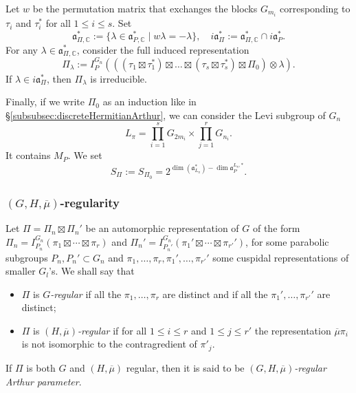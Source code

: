 \documentclass[letterpaper,11pt]{amsart}
\newcommand{\fa}{\mathfrak{a}}
\newcommand{\C}{\mathbb{C}}
\newcommand{\<}{\negthickspace}
\theoremstyle{definition}
\theoremstyle{plain}
\theoremstyle{remark}
\numberwithin{equation}{section}
\begin{document}
Let $w$ be the permutation matrix that exchanges the blocks $G_{m_i}$ corresponding to $\tau_i$ and $\tau_i^*$ for all $1 \leq i \leq s$. Set
\begin{equation}
\label{eq:fa_Pi}
    \fa_{\Pi,\C}^*:=\{ \lambda \in \fa_{P,\C}^* \; | \; w \lambda=-\lambda\}, \quad i\fa_{\Pi}^*:=\fa_{\Pi,\C}^* \cap i \fa_P^*.
\end{equation}
For any $\lambda \in \fa_{\Pi,\C}^*$, consider the full induced representation
\begin{equation*}
    \Pi_\lambda:=I_P^{G_n}(((\tau_1 \boxtimes \tau_1^*) \boxtimes \hdots \boxtimes (\tau_s \boxtimes \tau_s^*) \boxtimes \Pi_0)\otimes\lambda).
\end{equation*}
If $\lambda \in i\fa_{\Pi}^*$, then $\Pi_\lambda$ is irreducible.

Finally, if we write $\Pi_0$ as an induction like in \S\ref{subsubsec:discreteHermitianArthur}, we can consider the Levi subgroup of $G_n$
\begin{equation*}
    L_\pi=\prod_{i=1}^s G_{2 m_i} \times \prod_{j=1}^r G_{n_i}.
\end{equation*}
It contains $M_P$. We set
\begin{equation}
\label{eq:discrete_SPI_defi}
    S_{\Pi}:=S_{\Pi_0}=2^{\dim(\fa^*_{L_\pi})-\dim \fa_{P}^{L_\pi,*}}.
\end{equation}


\subsubsection{$(G,H,\overline{\mu})$-regularity}

Let $\Pi=\Pi_n \boxtimes \Pi_n'$ be an automorphic representation of $G$ of the form $\Pi_n=I_{P_n}^{G_n} (\pi_1 \boxtimes \cdots \boxtimes \pi_r)$ and $\Pi_n'=I_{P_n'}^{G_n} (\pi_1'\boxtimes \cdots \boxtimes \pi_{r'}')$, for some parabolic subgroups $P_n,P_n' \subset G_n$ and $\pi_1,\hdots,\pi_r,\pi_1',\hdots,\pi_{r'}'$ some cuspidal representations of smaller $G_l$'s. We shall say that
\begin{itemize}
    \item $\Pi$ is \emph{$G$-regular} if all the $\pi_1, \hdots, \pi_r$ are distinct and if all the $\pi_1', \hdots, \pi_{r'}'$ are distinct;
    \item $\Pi$ is \emph{$(H,\overline{\mu})$-regular} if for all $1 \leq i \leq r$ and $1\leq j \leq r'$ the representation $\overline{\mu} \pi_i$ is not isomorphic to the
contragredient of $\pi'_j$.
\end{itemize}
If $\Pi$ is both $G$ and $(H,\overline{\mu})$ regular, then it is said to be \emph{$(G,H,\overline{\mu})$-regular Arthur parameter}.
\end{document}
